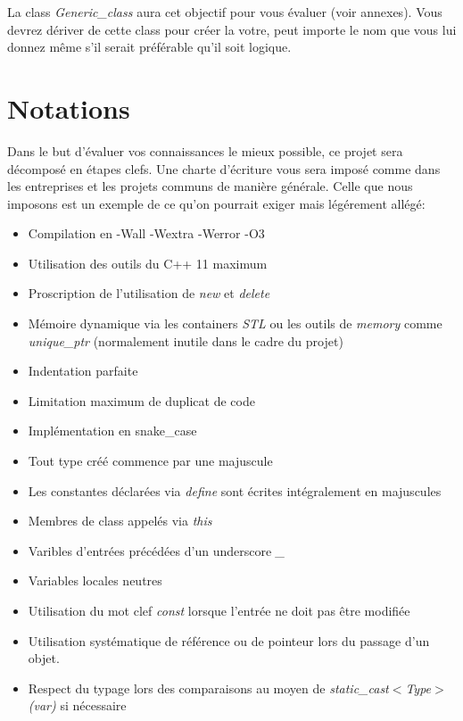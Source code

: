 \documentclass[9pts]{article}
\begin{document}
La class \emph{Generic\_class} aura cet objectif pour vous évaluer (voir annexes).
Vous devrez dériver de cette class pour créer la votre, peut importe le nom que vous lui donnez même s'il serait préférable qu'il soit logique.


\section{Notations}
Dans le but d'évaluer vos connaissances le mieux possible, ce projet sera décomposé en étapes clefs.
Une charte d'écriture vous sera imposé comme dans les entreprises et les projets communs de manière générale.
Celle que nous imposons est un exemple de ce qu'on pourrait exiger mais légérement allégé:\\
\begin{itemize}
\item Compilation en -Wall -Wextra -Werror -O3
\item Utilisation des outils du C++ 11 maximum
\item Proscription de l'utilisation de \emph{new} et \emph{delete}
\item Mémoire dynamique via les containers \emph{STL} ou les outils de \emph{memory} comme \emph{unique\_ptr} (normalement inutile dans le cadre du projet)
\item Indentation parfaite
\item Limitation maximum de duplicat de code
\item Implémentation en snake\_case
\item Tout type créé commence par une majuscule
\item Les constantes déclarées via \emph{define} sont écrites intégralement en majuscules
\item Membres de class appelés via \emph{this}
\item Varibles d'entrées précédées d'un underscore \emph{\_}
\item Variables locales neutres
\item Utilisation du mot clef \emph{const} lorsque l'entrée ne doit pas être modifiée
\item Utilisation systématique de référence ou de pointeur lors du passage d'un objet.
\item Respect du typage lors des comparaisons au moyen de \emph{static\_cast$<$Type$>$(var)} si nécessaire
\end{itemize}
\end{document}
